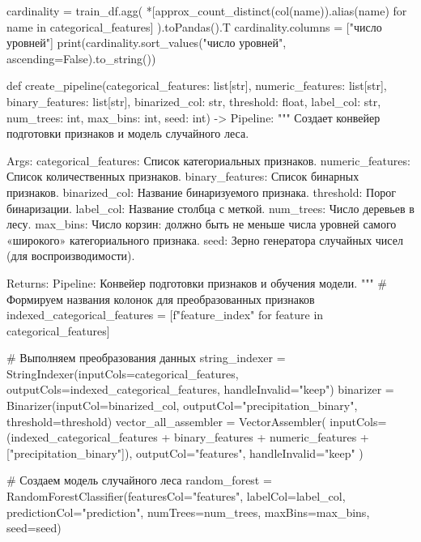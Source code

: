 \begin{code}
cardinality = train_df.agg(
    *[approx_count_distinct(col(name)).alias(name) for name in categorical_features]
).toPandas().T
cardinality.columns = ["число уровней"]
print(cardinality.sort_values("число уровней", ascending=False).to_string())

def create_pipeline(categorical_features: list[str], numeric_features: list[str],
                    binary_features: list[str], binarized_col: str,
                    threshold: float, label_col: str, num_trees: int,
                    max_bins: int, seed: int) -> Pipeline:
    """
    Создает конвейер подготовки признаков и модель случайного леса.

    Args:
        categorical_features: Список категориальных признаков.
        numeric_features: Список количественных признаков.
        binary_features: Список бинарных признаков.
        binarized_col: Название бинаризуемого признака.
        threshold: Порог бинаризации.
        label_col: Название столбца с меткой.
        num_trees: Число деревьев в лесу.
        max_bins: Число корзин: должно быть не меньше числа уровней
            самого «широкого» категориального признака.
        seed: Зерно генератора случайных чисел (для воспроизводимости).

    Returns:
        Pipeline: Конвейер подготовки признаков и обучения модели.
    """
    # Формируем названия колонок для преобразованных признаков
    indexed_categorical_features = [f"{feature}_index" for feature in categorical_features]

    # Выполняем преобразования данных
    string_indexer = StringIndexer(inputCols=categorical_features,
                                   outputCols=indexed_categorical_features,
                                   handleInvalid="keep")
    binarizer = Binarizer(inputCol=binarized_col,
                          outputCol="precipitation_binary",
                          threshold=threshold)
    vector_all_assembler = VectorAssembler(
        inputCols=(indexed_categorical_features + binary_features +
                   numeric_features + ["precipitation_binary"]),
        outputCol="features",
        handleInvalid="keep"
    )

    # Создаем модель случайного леса
    random_forest = RandomForestClassifier(featuresCol="features",
                                           labelCol=label_col,
                                           predictionCol="prediction",
                                           numTrees=num_trees,
                                           maxBins=max_bins,
                                           seed=seed)


\end{code}
